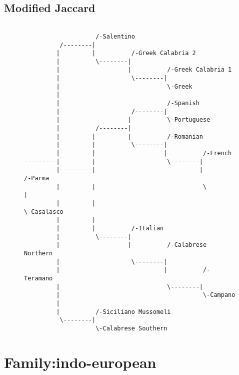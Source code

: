 \subsection{Modified Jaccard}
\begin{figure}[!htb]
\begin{center}
{
\selectfont
\begin{verbatim}

                    /-Salentino
          /--------|
         |         |          /-Greek Calabria 2
         |          \--------|
         |                   |          /-Greek Calabria 1
         |                    \--------|
         |                              \-Greek
         |
         |                              /-Spanish
         |                    /--------|
         |                   |          \-Portuguese
         |          /--------|
         |         |         |          /-Romanian
         |         |          \--------|
         |         |                   |          /-French
---------|         |                    \--------|
         |---------|                             |          /-Parma
         |         |                              \--------|
         |         |                                        \-Casalasco
         |         |
         |         |          /-Italian
         |          \--------|
         |                   |          /-Calabrese Northern
         |                    \--------|
         |                             |          /-Teramano
         |                              \--------|
         |                                        \-Campano
         |
         |          /-Siciliano Mussomeli
          \--------|
                    \-Calabrese Southern

\end{verbatim}
}
\label{...}
\end{center}
\end{figure}
\section{Family:indo-european}
